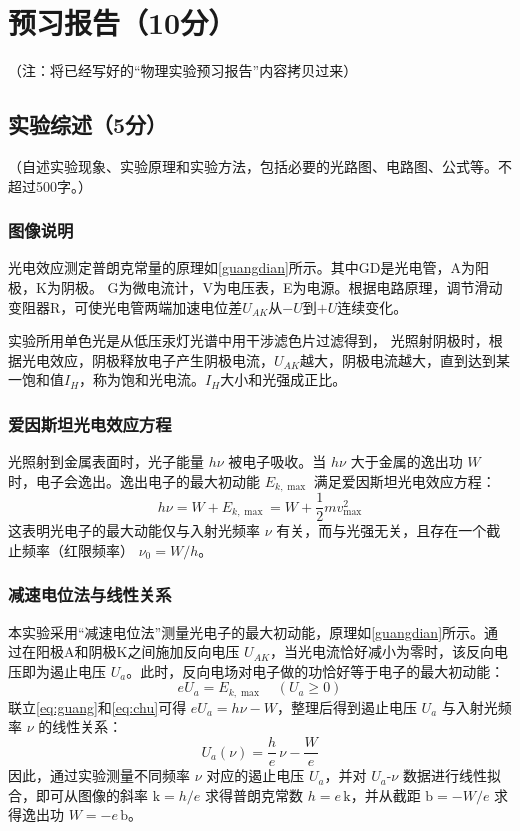 \documentclass{../template/Report}%
\begin{document}
\maketitle%

\section{预习报告（10分）}
（注：将已经写好的“物理实验预习报告”内容拷贝过来）

\subsection{实验综述（5分）}
（自述实验现象、实验原理和实验方法，包括必要的光路图、电路图、公式等。不超过500字。）

\subsubsection{图像说明}
光电效应测定普朗克常量的原理如\cref{guangdian}所示。其中GD是光电管，A为阳极，K为阴极。
G为微电流计，V为电压表，E为电源。根据电路原理，调节滑动变阻器R，可使光电管两端加速电位差$U_{AK}$从$-U$到$+U$连续变化。

实验所用单色光是从低压汞灯光谱中用干涉滤色片过滤得到，
光照射阴极时，根据光电效应，阴极释放电子产生阴极电流，$U_{AK}$越大，阴极电流越大，直到达到某一饱和值$I_H$，称为饱和光电流。$I_H$大小和光强成正比。
\subsubsection{爱因斯坦光电效应方程}
光照射到金属表面时，光子能量 $h\nu$ 被电子吸收。当 $h\nu$ 大于金属的逸出功 $W$ 时，电子会逸出。逸出电子的最大初动能 $E_{k,\max}$ 满足爱因斯坦光电效应方程：
\begin{equation}
    h\nu = W + E_{k,\max} = W + \frac{1}{2}mv^2_{\max} \label{eq:guang}
\end{equation}
这表明光电子的最大动能仅与入射光频率 $\nu$ 有关，而与光强无关，且存在一个截止频率（红限频率） $\nu_0 = W/h$。

\subsubsection{减速电位法与线性关系}
本实验采用“减速电位法”测量光电子的最大初动能，原理如\cref{guangdian}所示。通过在阳极A和阴极K之间施加反向电压 $U_{AK}$，当光电流恰好减小为零时，该反向电压即为遏止电压 $U_a$。此时，反向电场对电子做的功恰好等于电子的最大初动能：
\begin{equation}
    eU_a = E_{k,\max} \quad (U_a \ge 0) \label{eq:chu}
\end{equation}
联立\cref{eq:guang}和\cref{eq:chu}可得 $eU_a = h\nu - W$，整理后得到遏止电压 $U_a$ 与入射光频率 $\nu$ 的线性关系：
\begin{equation}
    U_a(\nu) = \frac{h}{e}\,\nu - \frac{W}{e}
\end{equation}
因此，通过实验测量不同频率 $\nu$ 对应的遏止电压 $U_a$，并对 $U_a$-$\nu$ 数据进行线性拟合，即可从图像的斜率 $\mathrm{k}=h/e$ 求得普朗克常数 $h=e\,\mathrm{k}$，并从截距 $\mathrm{b}=-W/e$ 求得逸出功 $W=-e\,\mathrm{b}$。
\end{document}
